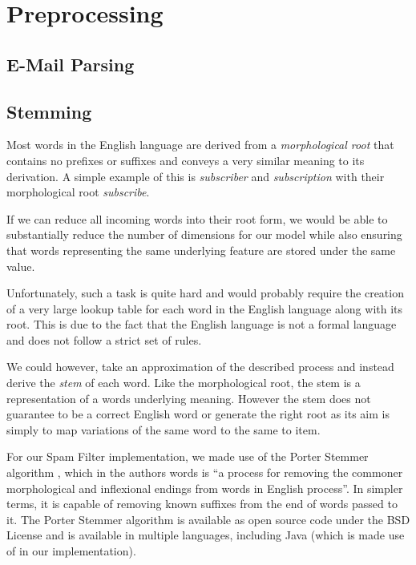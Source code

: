 \section{Preprocessing}

\subsection{E-Mail Parsing}

\subsection{Stemming}
Most words in the English language are derived from a {\it morphological root} that contains no prefixes or suffixes and conveys a very similar meaning to its derivation. A simple example of this is {\it subscriber} and {\it subscription} with their morphological root {\it subscribe}. 

If we can reduce all incoming words into their root form, we would be able to substantially reduce the number of dimensions for our model while also ensuring that words representing the same underlying feature are stored under the same value.

Unfortunately, such a task is quite hard and would probably require the creation of a very large lookup table for each word in the English language along with its root. This is due to the fact that the English language is not a formal language and does not follow a strict set of rules. 

We could however, take an approximation of the described process and instead derive the {\it stem} of each word. Like the morphological root, the stem is a representation of a words underlying meaning. However the stem does not guarantee to be a correct English word or generate the right root as its aim is simply to map variations of the same word to the same to item. 

For our Spam Filter implementation, we made use of the Porter Stemmer algorithm \cite{porter1980}, which in the authors words is ``a process for removing the commoner morphological and inflexional endings from words in English process''. In simpler terms, it is capable of removing known suffixes from the end of words passed to it. The Porter Stemmer algorithm is available as open source code under the BSD License and is available in multiple languages, including Java (which is made use of in our implementation).

